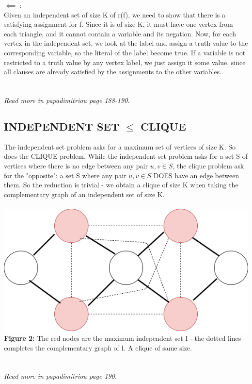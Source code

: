 \documentclass{article}
\begin{document}
$\impliedby$ :\\ Given an independent set of size K of r(f), we need to show that there is a satisfying assignment for f. Since it is of size K, it must have one vertex from each triangle, and it cannot contain a variable and its negation. Now, for each vertex in the independent set, we look at the label and assign a truth value to the corresponding variable, so the literal of the label become true. If a variable is not restricted to a truth value by any vertex label, we just assign it some value, since all clauses are already satisfied by the assignments to the other variables.\\\\\\
\textit{Read more in papadimitriou page 188-190.}
\newpage
\subsection{INDEPENDENT SET $\le$ CLIQUE}
The independent set problem asks for a maximum set of vertices of size K. So does the CLIQUE problem. While the independent set problem asks for a set S of vertices where there is no edge between any pair $u,v \in S$, the clique problem ask for the "opposite": a set S where any pair $u,v \in S$ DOES have an edge between them. So the reduction is trivial - we obtain a clique of size K when taking the complementary graph of an independent set of size K.\\\\
\includegraphics[scale=0.5]{IStoCLIQ}\\
\textbf{Figure 2:} The red nodes are the maximum independent set I - the dotted lines completes the complementary graph of I. A clique of same size.
\\\\\\
\textit{Read more in papadimitriou page 190.}
\end{document}
